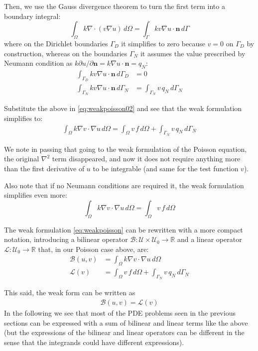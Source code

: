 \documentclass{digitaldynamics}
\def\vect#1{\bm{#1}}
\begin{document}
Then, we use the Gauss divergence theorem to turn the first term into a boundary integral:
\[
\int_\Omega k \nabla \cdot (v \nabla u)  \,d\Omega = \int_{\Gamma} k v \nabla u \cdot \vect{n} \,d\Gamma
\]
where on the Dirichlet boundaries $\Gamma_D$ it simplifies to zero because $v=0$ on $\Gamma_D$ by construction, whereas on the 
boundaries $\Gamma_N$ it assumes the value prescribed by Neumann condition as $ k \partial{u}/\partial{\vect{n}} = k \nabla u \cdot \vect{n} = q_N$:
\begin{align}
\int_{\Gamma_D} k v \nabla u \cdot \vect{n} \,d\Gamma_D &= 0 \\
\int_{\Gamma_N} k v \nabla u \cdot \vect{n} \,d\Gamma_N &= \int_{\Gamma_N} v \, q_N \,d\Gamma_N
\end{align}

Substitute the above in \eqref{eq:weakpoisson02} and see that the weak formulation simplifies to:
\begin{align}
  \int_\Omega k \nabla v \cdot \nabla u \,d\Omega = \int_\Omega  v \, f  \,d\Omega  + \int_{\Gamma_N} v \, q_N \,d\Gamma_N
	\label{eq:weakpoisson}
\end{align}

We note in passing that going to the weak formulation of the Poisson equation, the original $\nabla^2$ term disappeared, 
and now it does not require anything more than the first derivative of $u$ to be integrable 
(and same for the test function $v$).

Also note that if no Neumann conditions are required it, the weak formulation simplifies even more: 
\[
\int_\Omega k \nabla v \cdot \nabla u \,d\Omega = \int_\Omega  v \, f \,d\Omega 
\]

The weak formulation \eqref{eq:weakpoisson} can be rewritten with a more compact notation, introducing a
bilinear operator 
$\mathcal{B}: \mathcal{U} \times \mathcal{U}_0 \rightarrow \mathbb{R}$ 
and a linear operator 
$\mathcal{L}:  \mathcal{U}_0 \rightarrow \mathbb{R}$ 
that, in our Poisson case above, are:
\begin{align}
  \mathcal{B}(u,v) &= \int_\Omega k \nabla v \cdot \nabla u \,d\Omega      \label{eq:bilinearop}\\
	\mathcal{L}(v)   &= \int_\Omega v \, f \,d\Omega    + \int_{\Gamma_N} v \, q_N \,d\Gamma_N         \label{eq:linearop}
\end{align}

This said, the weak form can be written as
\begin{align}
\boxed{
\mathcal{B}(u,v) = \mathcal{L}(v)
}
\label{eq:weakbl}
\end{align}
In the following we see that most of the PDE problems seen in the previous sections can be expressed with a sum of bilinear and linear terms like the above (but the expressions of the bilinear and linear operators can be different in the sense that the integrands could have different expressions).
\end{document}
